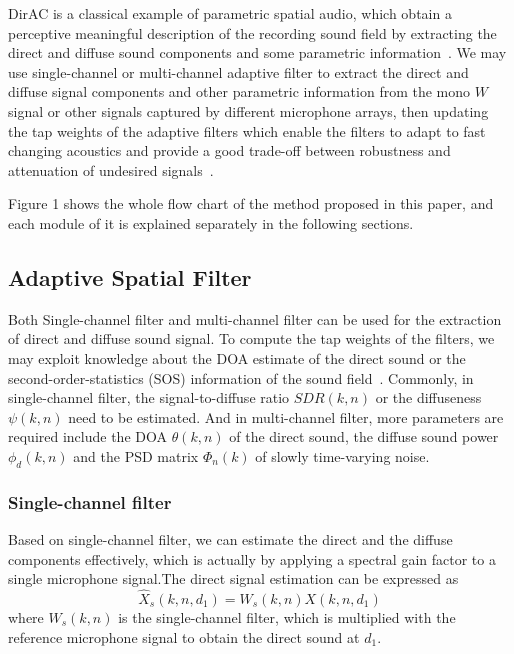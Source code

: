 \documentclass[10pt, a4paper, twocolumn]{article} %
\begin{document}
DirAC is a classical example of parametric spatial audio, which obtain a perceptive meaningful description of the recording sound field by extracting the direct and diffuse sound components and some parametric information~\cite{Reference3}. We may use single-channel or multi-channel adaptive filter to extract the direct and diffuse signal components and other parametric information from the mono $W$ signal or other signals captured by different microphone arrays, then updating the tap weights of the adaptive filters which enable the filters to adapt to fast changing acoustics and provide a good trade-off between robustness and attenuation of undesired signals~\parencite{Reference4}. 

Figure 1 shows the whole flow chart of the method proposed in this paper, and each module of it is explained separately in the following sections.


\subsection{Adaptive Spatial Filter}

Both Single-channel filter and multi-channel filter can be used for the extraction of direct and diffuse sound signal. To compute the tap weights of the filters, we may exploit knowledge about the DOA estimate of the direct sound or the second-order-statistics (SOS) information of the sound field~\parencite{Reference3}. Commonly, in single-channel filter, the signal-to-diffuse ratio $SDR(k,n)$ or the diffuseness $\psi(k,n)$ need to be estimated. And in multi-channel filter, more parameters are required include the DOA $\theta(k,n)$ of the direct sound, the diffuse sound power $\phi_d(k,n)$ and the PSD matrix $\Phi_n(k)$ of slowly time-varying noise.

\subsubsection{Single-channel filter}

Based on single-channel filter, we can estimate the direct and the diffuse components effectively, which is actually by applying a spectral gain factor to a single microphone signal.The direct signal estimation can be expressed as 
\begin{equation}
\hat{X}_s(k, n, d_1) = W_s(k, n)X(k, n, d_1)
\end{equation}
where $W_s(k,n)$ is the single-channel filter, which is multiplied with the reference microphone signal to obtain the direct sound at $d_1$. 
\end{document}
